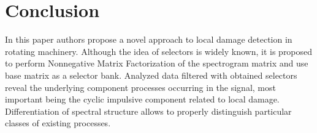 \documentclass[conference]{IEEEtran}
\begin{document}
%






\section{Conclusion}
In this paper authors propose a novel approach to local damage detection in rotating machinery. Although the idea of selectors is widely known, it is proposed to perform Nonnegative Matrix Factorization of the spectrogram matrix and use base matrix as a selector bank. Analyzed data filtered with obtained selectors reveal the underlying component processes occurring in the signal, most important being the cyclic impulsive component related to local damage. Differentiation of spectral structure allows to properly distinguish particular classes of existing processes.
\end{document}
